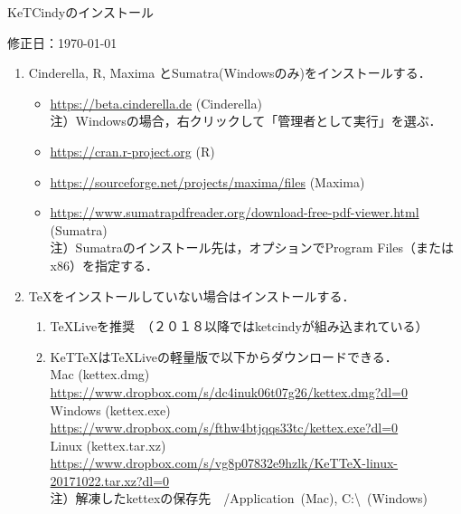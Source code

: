 \documentclass{ujarticle}
\begin{document}
\begin{center}
KeTCindyのインストール
\end{center}

\vspace{-5mm}

\hfill 修正日：\today

\begin{enumerate}[\bf\large 1.]
\item Cinderella, R, Maxima とSumatra(Windowsのみ)をインストールする．\vspace{-2mm}

 \begin{itemize}
 \item \url{https://beta.cinderella.de}  (Cinderella)\\
\hspace*{6mm}注）Windowsの場合，右クリックして「管理者として実行」を選ぶ．
 \item \url{https://cran.r-project.org}   (R)
 \item \url{https://sourceforge.net/projects/maxima/files}  (Maxima)
 \item \url{https://www.sumatrapdfreader.org/download-free-pdf-viewer.html} (Sumatra)\\
\hspace*{6mm}注）Sumatraのインストール先は，オプションでProgram Files（またはx86）を指定する．

 \end{itemize}
\item TeXをインストールしていない場合はインストールする．\vspace{-2mm}
 \begin{enumerate}[(1)]
 \item TeXLiveを推奨　（２０１８以降ではketcindyが組み込まれている）
 \item KeTTeXはTeXLiveの軽量版で以下からダウンロードできる．\\
    \hspace*{5mm}Mac (kettex.dmg)\\
    \hspace*{10mm}\url{https://www.dropbox.com/s/dc4inuk06t07g26/kettex.dmg?dl=0}\\
    \hspace*{5mm}Windows (kettex.exe)\\
    \hspace*{10mm}\url{https://www.dropbox.com/s/fthw4btjqqs33tc/kettex.exe?dl=0}\\
    \hspace*{5mm}Linux (kettex.tar.xz)\\
    \hspace*{10mm}\url{https://www.dropbox.com/s/vg8p07832e9hzlk/KeTTeX-linux-20171022.tar.xz?dl=0}\\
    \hspace*{5mm}注）解凍したkettexの保存先　/Application\ (Mac), C:\textbackslash\ (Windows)


\end{enumerate}
\end{enumerate}
\end{document}

